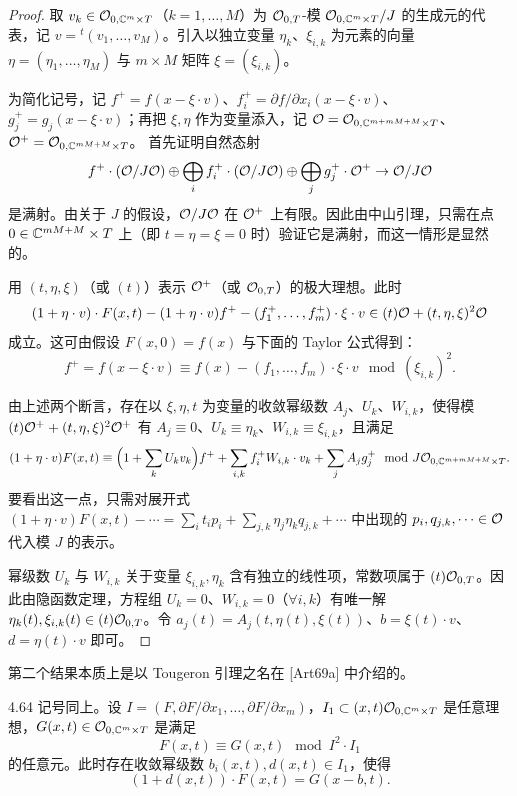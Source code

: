 \begin{proof}
取 $v_k\in\mathcal{O}_{0,\mathbb{C}^m\times T}$（$k=1,\dots,M$）为 $\mathcal{O}_{0,T}$-模 $\mathcal{O}_{0,\mathbb{C}^m\times T}/J$ 的生成元的代表，记 $v={}^t(v_1,\dots,v_M)$。引入以独立变量 $\eta_k$、$\xi_{i,k}$ 为元素的向量 $\eta=(\eta_1,\dots,\eta_M)$ 与 $m\times M$ 矩阵 $\xi=(\xi_{i,k})$。

为简化记号，记 $f^+=f(x-\xi\cdot v)$、$f_i^+=\partial f/\partial x_i(x-\xi\cdot v)$、$g_j^+=g_j(x-\xi\cdot v)$；再把 $\xi,\eta$ 作为变量添入，记 $\mathcal{O}=\mathcal{O}_{0,\mathbb{C}^{m+mM+M}\times T}$、$\mathcal{O}^+=\mathcal{O}_{0,\mathbb{C}^{mM+M}\times T}$。
首先证明自然态射
\[ f^+\cdot(\mathcal{O}/J\mathcal{O})\oplus\bigoplus_i f_i^+\cdot(\mathcal{O}/J\mathcal{O})\oplus\bigoplus_j g_j^+\cdot\mathcal{O}^+\to\mathcal{O}/J\mathcal{O} \]
是满射。由关于 $J$ 的假设，$\mathcal{O}/J\mathcal{O}$ 在 $\mathcal{O}^+$ 上有限。因此由中山引理，只需在点 $0\in\mathbb{C}^{mM+M}\times T$ 上（即 $t=\eta=\xi=0$ 时）验证它是满射，而这一情形是显然的。

用 $(t,\eta,\xi)$（或 $(t)$）表示 $\mathcal{O}^+$（或 $\mathcal{O}_{0,T}$）的极大理想。此时
\[ (1+\eta\cdot v)\cdot F(x,t)-(1+\eta\cdot v)f^+-(f_1^+,\dots,f_m^+)\cdot\xi\cdot v\in(t)\mathcal{O}+(t,\eta,\xi)^2\mathcal{O} \]
成立。这可由假设 $F(x,0)=f(x)$ 与下面的 Taylor 公式得到：
\[ f^+=f(x-\xi\cdot v)\equiv f(x)-(f_1,\dots,f_m)\cdot\xi\cdot v\mod(\xi_{i,k})^2. \]

由上述两个断言，存在以 $\xi,\eta,t$ 为变量的收敛幂级数 $A_j$、$U_k$、$W_{i,k}$，使得模 $(t)\mathcal{O}^++(t,\eta,\xi)^2\mathcal{O}^+$ 有 $A_j\equiv0$、$U_k\equiv\eta_k$、$W_{i,k}\equiv\xi_{i,k}$，且满足
\[ (1+\eta\cdot v)F(x,t)\equiv\Bigl(1+\sum_kU_kv_k\Bigr)f^++\sum_{i,k}f_i^+W_{i,k}\cdot v_k+\sum_jA_jg_j^+\mod J\mathcal{O}_{0,\mathbb{C}^{m+mM+M}\times T}. \]
要看出这一点，只需对展开式 $(1+\eta\cdot v)F(x,t)-\cdots=\sum_it_ip_i+\sum_{j,k}\eta_j\eta_kq_{j,k}+\cdots$ 中出现的 $p_i,q_{j,k},\cdots\in\mathcal{O}$ 代入模 $J$ 的表示。

幂级数 $U_k$ 与 $W_{i,k}$ 关于变量 $\xi_{i,k},\eta_k$ 含有独立的线性项，常数项属于 $(t)\mathcal{O}_{0,T}$。因此由隐函数定理，方程组 $U_k=0$、$W_{i,k}=0$（$\forall i,k$）有唯一解 $\eta_k(t),\xi_{i,k}(t)\in(t)\mathcal{O}_{0,T}$。令 $a_j(t)=A_j(t,\eta(t),\xi(t))$、$b=\xi(t)\cdot v$、$d=\eta(t)\cdot v$ 即可。
\end{proof}

第二个结果本质上是以 Tougeron 引理之名在 [Art69a] 中介绍的。

\begin{lemmap}{4.64}
记号同上。设 $I=(F,\partial F/\partial x_1,\dots,\partial F/\partial x_m)$，$I_1\subset(x,t)\mathcal{O}_{0,\mathbb{C}^m\times T}$ 是任意理想，$G(x,t)\in\mathcal{O}_{0,\mathbb{C}^m\times T}$ 是满足
\[ F(x,t)\equiv G(x,t)\mod I^2\cdot I_1 \]
的任意元。此时存在收敛幂级数 $b_i(x,t),d(x,t)\in I_1$，使得
\[ (1+d(x,t))\cdot F(x,t)=G(x-b,t). \]
\end{lemmap}

